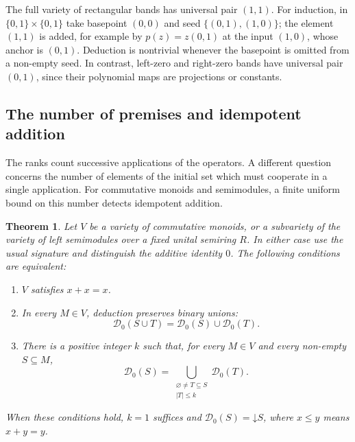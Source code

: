 \documentclass[12pt,english]{amsart}
\newtheorem{theorem}{Theorem}[section]
\theoremstyle{definition}
\numberwithin{equation}{section}
\theoremstyle{remark}
\begin{document}
The full variety of rectangular bands has universal pair $(1,1)$.
For induction, in $\{0,1\}\times\{0,1\}$ take basepoint $(0,0)$
and seed $\{(0,1),(1,0)\}$; the element $(1,1)$ is added, for
example by $p(z)=z(0,1)$ at the input $(1,0)$, whose anchor is
$(0,1)$. Deduction is nontrivial whenever the basepoint is omitted
from a non-empty seed. In contrast, left-zero and right-zero
bands have universal pair $(0,1)$, since their polynomial maps
are projections or constants.

\subsection{The number of premises and idempotent addition}
\label{SubsecDetPremises}

The ranks count successive applications of the operators. A different
question concerns the number of elements of the initial set which must
cooperate in a single application. For commutative monoids and
semimodules, a finite uniform bound on this number detects idempotent
addition.

\begin{theorem}\label{ThmDetFinitePremises}
Let $V$ be a variety of commutative monoids, or a subvariety of the
variety of left semimodules over a fixed unital semiring $R$. In either
case use the usual signature and distinguish the additive identity
$0$. The following conditions are equivalent:
\begin{enumerate}
\item $V$ satisfies $x+x=x$.
\item In every $M\in V$, deduction preserves binary unions:
\[
\mathcal D_0(S\cup T)=\mathcal D_0(S)\cup\mathcal D_0(T).
\]
\item There is a positive integer $k$ such that, for every $M\in V$
and every non-empty $S\subseteq M$,
\begin{equation}\label{EqDetFinitePremises}
\mathcal D_0(S)=
\bigcup_{\substack{\varnothing\ne T\subseteq S\\ |T|\leqslant k}}
\mathcal D_0(T).
\end{equation}
\end{enumerate}
When these conditions hold, $k=1$ suffices and
$\mathcal D_0(S)=\mathord\downarrow S$, where
$x\leqslant y$ means $x+y=y$.
\end{theorem}
\end{document}
